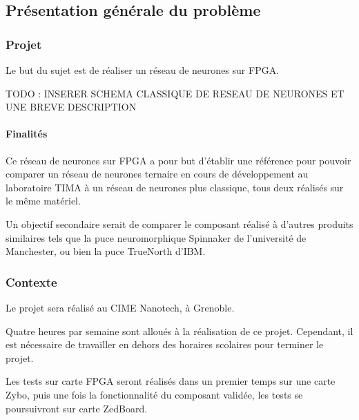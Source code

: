 
\subsection{Présentation générale du problème}

\subsubsection{Projet}
Le but du sujet est de réaliser un réseau de neurones sur FPGA.

TODO : INSERER SCHEMA CLASSIQUE DE RESEAU DE NEURONES ET UNE BREVE DESCRIPTION

\paragraph{Finalités\\}

Ce réseau de neurones sur FPGA a pour but d'établir une référence pour pouvoir
comparer un réseau de neurones ternaire en cours de développement au laboratoire
TIMA à un réseau de neurones plus classique, tous deux réalisés sur le même 
matériel.

Un objectif secondaire serait de comparer le composant réalisé à d'autres
produits similaires tels que la puce neuromorphique Spinnaker de l'université
de Manchester, ou bien la puce TrueNorth d'IBM.

\subsubsection{Contexte}

Le projet sera réalisé au CIME Nanotech, à Grenoble. 

Quatre heures par semaine sont alloués à la réalisation de ce projet. Cependant,
il est nécessaire de travailler en dehors des horaires scolaires pour terminer 
le projet.

Les tests sur carte FPGA seront réalisés dans un premier temps sur une carte Zybo,
puis une fois la fonctionnalité du composant validée, les tests se poursuivront 
sur carte ZedBoard.

